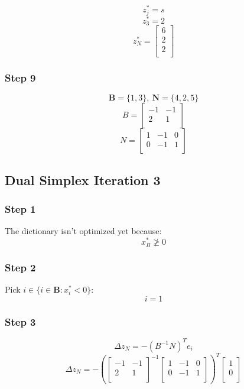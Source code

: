 \documentclass[14pt]{extarticle}
\begin{document}
\[
    z^*_j = s
\]
\[
    z^*_3 = 2
\]
\[
    z^*_N = \begin{bmatrix}
        6 \\
        2 \\
        2 \\
    \end{bmatrix}
\]

\subsubsection*{Step 9}
\[
    \boldsymbol{B} = \{1, 3\},\ \boldsymbol{N} = \{4, 2, 5\}
\]
\[
    B = \begin{bmatrix}
        -1 & -1 \\
        2 & 1 \\
    \end{bmatrix}
\]
\[
    N = \begin{bmatrix}
        1 & -1 & 0 \\
        0 & -1 & 1 \\
    \end{bmatrix}
\]

\subsection*{Dual Simplex Iteration 3}
\subsubsection*{Step 1}
The dictionary isn't optimized yet because:
\[
    x^*_B \ngeq 0
\]

\subsubsection*{Step 2}
Pick $i \in \{i \in \boldsymbol{B}: x^*_i < 0\}$:
\[
    i = 1
\]

\subsubsection*{Step 3}
\[
    \Delta z_N = -(B^{-1}N)^T e_i
\]
\[
    \Delta z_N = -\left(\begin{bmatrix}
        -1 & -1 \\
        2 & 1 \\
    \end{bmatrix}^{-1}
    \begin{bmatrix}
        1 & -1 & 0 \\
        0 & -1 & 1 \\
    \end{bmatrix}\right)^T
    \begin{bmatrix}
        1 \\
        0 \\
    \end{bmatrix}
\]
\end{document}
